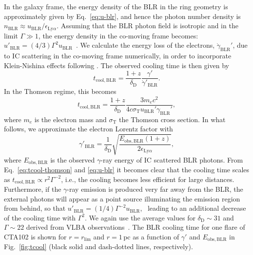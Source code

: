 \documentclass[twocolumn,linenumbers]{aastex62}
\newcommand{\gray}{$\gamma$-ray\xspace}
\begin{document}
In the galaxy frame, the energy density of the BLR in the ring geometry is approximately given by Eq.~\ref{eq:u-blr}, and hence the photon number density is $n_\mathrm{BLR} \approx u_\mathrm{BLR} / \epsilon_{\mathrm{Ly}\alpha}$.
Assuming that the BLR photon field is isotropic and in the limit $\Gamma \gg 1$, the energy density in the co-moving frame becomes:
$u'_\mathrm{BLR} = (4/3)\Gamma^2 u_\mathrm{BLR}$~\citep{1994ApJS...90..945D,2002ApJ...575..667D}.
We calculate the energy loss of the electrons, $\dot{\gamma}_\mathrm{BLR}'$, due to IC scattering in the co-moving frame numerically, in order to incorporate Klein-Nishina   effects following \citet{1970RvMP...42..237B}.
The observed cooling time is then given by
\begin{equation}
    t_\mathrm{cool,BLR} = \frac{1 + z}{\delta_\mathrm{D}} \frac{\gamma'}{\dot{\gamma}'_\mathrm{BLR}}.
    \label{eq:tcool}
\end{equation}
In the Thomson regime, this becomes
\begin{equation}
    t_\mathrm{cool,BLR} = \frac{1+z}{\delta_\mathrm{D}}\frac{3m_ec^2}{4c\sigma_\mathrm{T}u_\mathrm{BLR}'\gamma_\mathrm{BLR}'},
    \label{eq:tcool-thomson}
\end{equation}
where $m_e$ is the electron mass and $\sigma_\mathrm{T}$ the Thomson cross section. 
In what follows, we approximate the electron Lorentz factor with~\citep[e.g.,][]{2009herb.book.....D,finke2016}
\begin{equation}
    \gamma'_\mathrm{BLR} = \frac{1}{ \delta_\mathrm{D}}\sqrt{\frac{E_\mathrm{obs,BLR}(1+z)}{2\epsilon_{\mathrm{Ly}\alpha}}},
    \label{eq:gammaprime}
\end{equation}
where $E_\mathrm{obs,BLR}$ is the observed \gray energy of IC scattered BLR photons. 
From Eq.~\ref{eq:tcool-thomson} and \ref{eq:u-blr} it becomes clear that the cooling time scales as $t_\mathrm{cool, BLR}\propto r^2 \Gamma^{-2}$, i.e., the cooling becomes less efficient for large distances. 
Furthermore, if the \gray emission is produced very far away from the BLR, the external photons will appear as a point source illuminating the emission region from behind, so that $u'_\mathrm{BLR} = (1/4)\Gamma^{-2} u_\mathrm{BLR}$,~\citep{1994ApJS...90..945D} leading to an additional decrease of the cooling time with $\Gamma^2$. 
We again use the average values for $\delta_\mathrm{D}\sim31$ and $\Gamma\sim22$ derived from VLBA observations~\citep{2017ApJ...846...98J}.
The BLR cooling time for one flare of CTA102 is shown for $r=r_\mathrm{lim}$ and $r = 1\,$pc as a function of $\gamma'$ and $E_\mathrm{obs,BLR}$ in Fig.~\ref{fig:tcool} (black solid and dash-dotted lines, respectively). 
\end{document}
